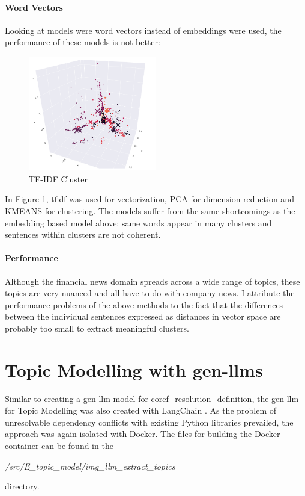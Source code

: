 \paragraph{Word Vectors}
Looking at models were word vectors instead of embeddings were used, the performance of these models is not better:
\begin{figure}[H]   %
    \centering
    \includegraphics[width=0.50\textwidth]{Assets/topic-tfidf-cluster}
    \caption{TF-IDF Cluster}
    \label{fig:topic-tfidf-cluster}
\end{figure}

In Figure \ref{fig:topic-tfidf-cluster}, \gls{tfidf} was used for vectorization, PCA for dimension reduction and KMEANS for clustering.
The models suffer from the same shortcomings as the embedding based model above: same words appear in many clusters and sentences within clusters are not coherent.

\paragraph{Performance}
Although the financial news domain spreads across a wide range of topics, these topics are very nuanced and all have to do with company news.
I attribute the performance problems of the above methods to the fact that the differences between the individual sentences expressed
as distances in vector space are probably too small to extract meaningful clusters.

\section{Topic Modelling with \gls{gen-llm}s}\label{sec:topic-gen-llm}
Similar to creating a \gls{gen-llm} model for \gls{coref_resolution_definition}, the \gls{gen-llm} for Topic Modelling was also created with LangChain \cite{LangChain}.
As the problem of unresolvable dependency conflicts with existing Python libraries prevailed, the approach was again isolated with Docker.
The files for building the Docker container can be found in the
\begin{center}
\emph{/src/E\_topic\_model/img\_llm\_extract\_topics}
\end{center}
directory.

